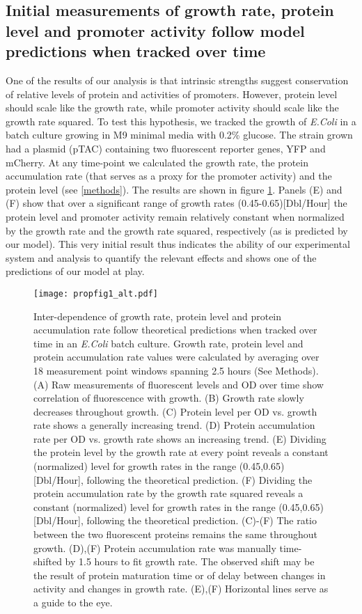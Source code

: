 \documentclass[a4page,notitlepage]{article}
\begin{document}
\subsection{Initial measurements of growth rate, protein level and promoter activity follow model predictions when tracked over time}
One of the results of our analysis is that intrinsic strengths suggest conservation of relative levels of protein and activities of promoters.
However, protein level should scale like the growth rate, while promoter activity should scale like the growth rate squared.
To test this hypothesis, we tracked the growth of \emph{E.Coli} in a batch culture growing in M9 minimal media with 0.2\% glucose.
The strain grown had a plasmid (pTAC) containing two fluorescent reporter genes, YFP and mCherry.
At any time-point we calculated the growth rate, the protein accumulation rate (that serves as a proxy for the promoter activity) and the protein level (see \ref{methods}).
The results are shown in figure \ref{time-gr-fig}.
Panels (E) and (F) show that over a significant range of growth rates (0.45-0.65)[Dbl/Hour] the protein level and promoter activity remain relatively constant when normalized by the growth rate and the growth rate squared, respectively (as is predicted by our model).
This very initial result thus indicates the ability of our experimental system and analysis to quantify the relevant effects and shows one of the predictions of our model at play.
\begin{figure}[h]
\texttt{[image: propfig1\_alt.pdf]}
\caption{Inter-dependence of growth rate, protein level and protein accumulation rate follow theoretical predictions when tracked over time in an \emph{E.Coli} batch culture.
Growth rate, protein level and protein accumulation rate values were calculated by averaging over 18 measurement point windows spanning 2.5 hours (See Methods).
(A) Raw measurements of fluorescent levels and OD over time show correlation of fluorescence with growth.
(B) Growth rate slowly decreases throughout growth.
(C) Protein level per OD vs. growth rate shows a generally increasing trend.
(D) Protein accumulation rate per OD vs. growth rate shows an increasing trend.
(E) Dividing the protein level by the growth rate at every point reveals a constant (normalized) level for growth rates in the range (0.45,0.65)[Dbl/Hour], following the theoretical prediction.
(F) Dividing the protein accumulation rate by the growth rate squared reveals a constant (normalized) level for growth rates in the range (0.45,0.65)[Dbl/Hour], following the theoretical prediction.
(C)-(F) The ratio between the two fluorescent proteins remains the same throughout growth.
(D),(F) Protein accumulation rate was manually time-shifted by 1.5 hours to fit growth rate.
The observed shift may be the result of protein maturation time or of delay between changes in activity and changes in growth rate.
(E),(F) Horizontal lines serve as a guide to the eye.
}
\label{time-gr-fig}
\end{figure}
\end{document}
